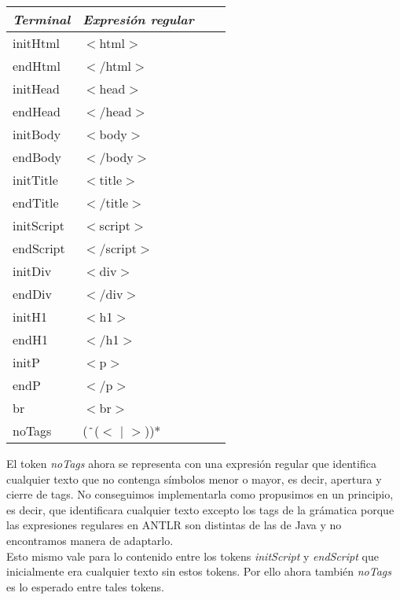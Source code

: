 \begin{center}
    \begin{tabular}{| l | l | l | p{5cm} |}
    \hline
    \textbf{\textit{Terminal}} 	& \textbf{\textit{Expresi\'on regular}} 	\\ \hline
    initHtml 		& $<$html$>$ 			 \\ \hline
    endHtml  		& $<$/html$>$  			 \\ \hline
    initHead		& $<$head$>$ 			 \\ \hline
    endHead	 	& $<$/head$>$ 			 \\ \hline
    initBody 		& $<$body$>$ 			 \\ \hline
    endBody		& $<$/body$>$  			 \\ \hline
    initTitle 		& $<$title$>$ 			 \\ \hline
    endTitle  		& $<$/title$>$ 			 \\ \hline
    initScript		& $<$script$>$ 			 \\ \hline
    endScript		& $<$/script$>$  			 \\ \hline
    initDiv		& $<$div$>$ 			 \\ \hline
    endDiv		&  $<$/div$>$ 			 \\ \hline
    initH1		& $<$h1$>$ 			 \\ \hline
    endH1		& $<$/h1$>$  			 \\ \hline
    initP 		& $<$p$>$ 				 \\ \hline
    endP 		& $<$/p$>$ 				 \\ \hline
    br			&$<$br$>$ 				 \\ \hline
    noTags		&($\string~$($<$ $|$ $>$))* 			 \\ \hline

    \end{tabular}
\end{center}

\indent El token \textit{noTags} ahora se representa con una expresi\'on regular que identifica cualquier texto que no contenga s\'imbolos menor o mayor, es decir, apertura y cierre de tags. No conseguimos implementarla como propusimos en un principio, es decir, que identificara cualquier texto excepto los tags de la gr\'amatica porque las expresiones regulares en ANTLR son distintas de las de Java y no encontramos manera de adaptarlo.\\
\indent Esto mismo vale para lo contenido entre los tokens \textit{initScript} y \textit{endScript} que inicialmente era cualquier texto sin estos tokens. Por ello ahora tambi\'en \textit{noTags} es lo esperado entre tales tokens.